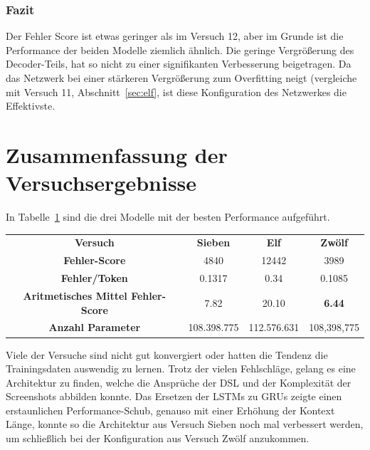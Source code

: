 \documentclass[pdftex,a4paper,halfparskip, article]{scrartcl}
\begin{document}
\begin{figure}
\begin{minipage}{.33\textwidth}
  \label{fig:fehler_schlechteste20_bin18_2}
\end{minipage}
\end{figure}

\subsubsection*{Fazit}

Der Fehler Score ist etwas geringer als im Versuch 12, aber im Grunde ist die Performance der beiden Modelle ziemlich ähnlich. Die geringe Vergrößerung des Decoder-Teils, hat so nicht zu einer signifikanten Verbesserung beigetragen. Da das Netzwerk bei einer stärkeren Vergrößerung zum Overfitting neigt (vergleiche mit Versuch 11, Abschnitt~\ref{sec:elf}, ist diese Konfiguration des Netzwerkes die Effektivste.

\section{Zusammenfassung der Versuchsergebnisse}

In Tabelle~\ref{tab:comparison} sind die drei Modelle mit der besten Performance aufgeführt.

\begin{table}[]
\begin{tabular}{cccc}
\textbf{Versuch}                           & \textbf{Sieben} & \textbf{Elf} & \textbf{Zwölf} \\
\textbf{Fehler-Score}                      & 4840            & 12442        & 3989           \\
\textbf{Fehler/Token}                      & 0.1317          & 0.34         & 0.1085         \\
\textbf{Aritmetisches Mittel Fehler-Score} & 7.82            & 20.10        & \textbf{6.44}           \\
\textbf{Anzahl Parameter}                  & 108.398.775     & 112.576.631  & 108,398,775   
\end{tabular}
\label{tab:comparison}
\end{table}

Viele der Versuche sind nicht gut konvergiert oder hatten die Tendenz die Trainingsdaten auswendig zu lernen. Trotz der vielen Fehlschläge, gelang es eine Architektur zu finden, welche die Ansprüche der DSL und der Komplexität der Screenshots abbilden konnte. 
Das Ersetzen der LSTMs zu GRUs zeigte einen erstaunlichen Performance-Schub, genauso mit einer Erhöhung der Kontext Länge, konnte so die Architektur aus Versuch Sieben noch mal verbessert werden, um schließlich bei der Konfiguration aus Versuch Zwölf anzukommen. 
\end{document}
